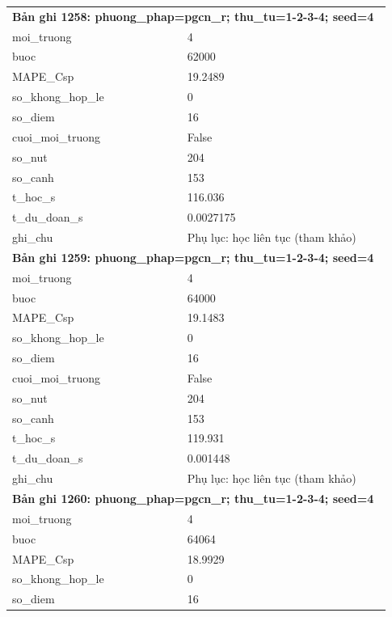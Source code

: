 \begin{longtable}{p{0.43\linewidth}p{0.50\linewidth}}
\midrule
\multicolumn{2}{p{0.95\linewidth}}{\textbf{Bản ghi 1258: phuong\_phap=pgcn\_r; thu\_tu=1-2-3-4; seed=4}} \\
moi\_\allowbreak truong & 4 \\
buoc & 62000 \\
MAPE\_\allowbreak Csp & 19.2489 \\
so\_\allowbreak khong\_\allowbreak hop\_\allowbreak le & 0 \\
so\_\allowbreak diem & 16 \\
cuoi\_\allowbreak moi\_\allowbreak truong & False \\
so\_\allowbreak nut & 204 \\
so\_\allowbreak canh & 153 \\
t\_\allowbreak hoc\_\allowbreak s & 116.036 \\
t\_\allowbreak du\_\allowbreak doan\_\allowbreak s & 0.0027175 \\
ghi\_\allowbreak chu & Phụ lục: học liên tục (tham khảo) \\
\midrule
\multicolumn{2}{p{0.95\linewidth}}{\textbf{Bản ghi 1259: phuong\_phap=pgcn\_r; thu\_tu=1-2-3-4; seed=4}} \\
moi\_\allowbreak truong & 4 \\
buoc & 64000 \\
MAPE\_\allowbreak Csp & 19.1483 \\
so\_\allowbreak khong\_\allowbreak hop\_\allowbreak le & 0 \\
so\_\allowbreak diem & 16 \\
cuoi\_\allowbreak moi\_\allowbreak truong & False \\
so\_\allowbreak nut & 204 \\
so\_\allowbreak canh & 153 \\
t\_\allowbreak hoc\_\allowbreak s & 119.931 \\
t\_\allowbreak du\_\allowbreak doan\_\allowbreak s & 0.001448 \\
ghi\_\allowbreak chu & Phụ lục: học liên tục (tham khảo) \\
\midrule
\multicolumn{2}{p{0.95\linewidth}}{\textbf{Bản ghi 1260: phuong\_phap=pgcn\_r; thu\_tu=1-2-3-4; seed=4}} \\
moi\_\allowbreak truong & 4 \\
buoc & 64064 \\
MAPE\_\allowbreak Csp & 18.9929 \\
so\_\allowbreak khong\_\allowbreak hop\_\allowbreak le & 0 \\
so\_\allowbreak diem & 16 \\

\end{longtable}
